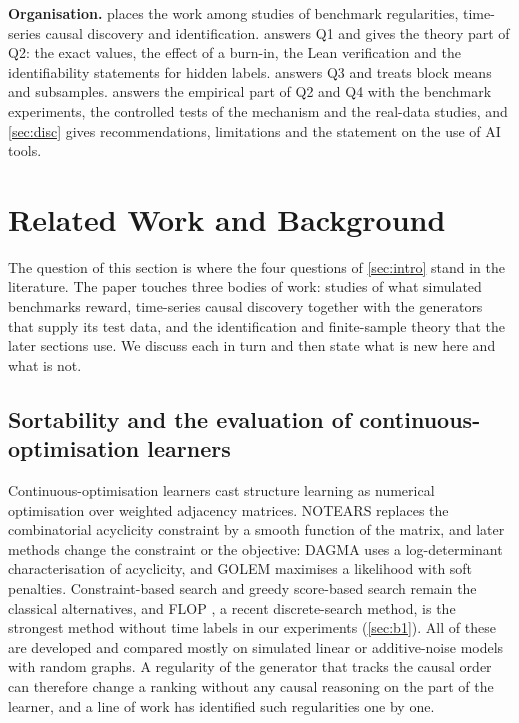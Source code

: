 \documentclass[pdflatex,sn-apa]{sn-jnl}
\theoremstyle{thmstyleone}
\theoremstyle{thmstylethree}
\theoremstyle{thmstyletwo}
\begin{document}
\textbf{Organisation.}  places the work among studies of
benchmark regularities, time-series causal discovery and identification.
 answers Q1 and gives the theory part of Q2: the exact values,
the effect of a burn-in, the Lean verification and the identifiability
statements for hidden labels.  answers Q3 and treats block
means and subsamples.  answers the empirical part of Q2
and Q4 with the benchmark experiments, the controlled tests of the mechanism and the real-data studies, and
\cref{sec:disc} gives recommendations, limitations and the statement on the use
of AI tools.

\section{Related Work and Background}
\label{sec:related}

The question of this section is where the four questions of
\cref{sec:intro} stand in the literature. The paper touches three bodies of
work: studies of what simulated benchmarks reward, time-series causal discovery
together with the generators that supply its test data, and the identification
and finite-sample theory that the later sections use. We discuss each in turn
and then state what is new here and what is not.

\subsection{Sortability and the evaluation of continuous-optimisation learners}
\label{sec:rw-sort}

Continuous-optimisation learners cast structure learning as numerical
optimisation over weighted adjacency matrices. NOTEARS \citep{zheng2018notears}
replaces the combinatorial acyclicity constraint by a smooth function of the
matrix, and later methods change the constraint or the objective: DAGMA
\citep{bello2022dagma} uses a log-determinant characterisation of acyclicity,
and GOLEM \citep{ng2020golem} maximises a likelihood with soft penalties.
Constraint-based search \citep{spirtes2000causation} and greedy score-based
search \citep{chickering2002optimal} remain the classical alternatives, and
FLOP \citep{wienobst2026flop}, a recent discrete-search method, is the
strongest method without time labels in our experiments
(\cref{sec:b1}). All of these are developed and compared mostly on simulated
linear or additive-noise models with random graphs. A regularity of the
generator that tracks the causal order can therefore change a ranking without
any causal reasoning on the part of the learner, and a line of work has
identified such regularities one by one.
\end{document}
